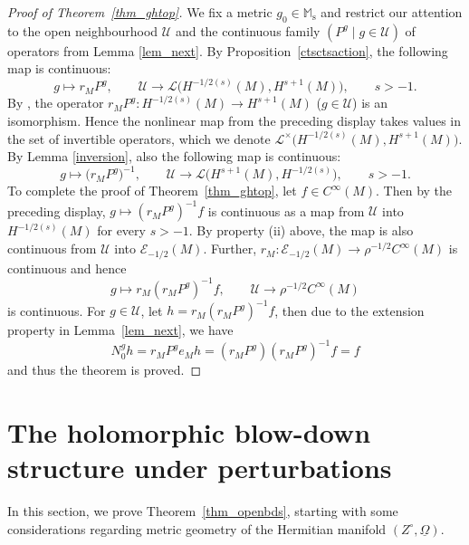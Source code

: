 \documentclass[10pt,a4paper]{amsart}
\numberwithin{equation}{section}
\theoremstyle{definition}
\newcommand{\M}{\mathbb{M}}
\newcommand{\1}{{\bf 1}}
\newcommand{\Om}{{\underline{\Omega}}}
\begin{document}
\begin{proof}[Proof of Theorem~\ref{thm_ghtop}] We fix a metric $g_0 \in \M_\mathrm{s}$ and restrict our attention to the open neighbourhood $\mathcal U$ and the continuous family $(P^g\mid g\in \mathcal U)$ of operators from Lemma \ref{lem_next}. By Proposition~\ref{ctsctsaction}, the following map is continuous:
\begin{equation*}
g\mapsto r_MP^g,\qquad \mathcal U\rightarrow \mathcal L\bigl(H^{-1/2(s)}(M),H^{s+1}(M)\bigr),\qquad s>-1.
\end{equation*}
By \cite[Theorem~4.4]{MNP19a}, the operator $r_MP^g \colon H^{-1/2(s)}(M)\rightarrow H^{s+1}(M)$ ($g\in \mathcal U$) is an isomorphism. Hence the nonlinear map from the preceding display takes values in the set of invertible operators, which we denote
$
\mathcal L^\times\bigl(H^{-1/2(s)}(M),H^{s+1}(M)\bigr)$.
By Lemma \ref{inversion}, also the following map is continuous:
\begin{equation*}
g\mapsto \bigl(r_M P^g\bigr)^{-1},\qquad \mathcal U \rightarrow \mathcal L\bigl(H^{s+1}(M),H^{-1/2(s)}\bigr),\qquad s>-1.
\end{equation*}
To complete the proof of Theorem~\ref{thm_ghtop}, let $f\in C^\infty(M)$. Then by the preceding display, $ g\mapsto (r_M P^g)^{-1} f$ is continuous as a map from $\mathcal U$ into $H^{-1/2(s)}(M)$ for every $s>-1$. By property (ii) above, the map is also continuous from $\mathcal U$ into $\mathcal E_{-1/2}(M)$. Further, $r_M\colon \mathcal E_{-1/2}(M)\rightarrow \rho^{-1/2}C^\infty(M)$ is continuous and hence
\begin{equation*}
g\mapsto r_M(r_MP^g)^{-1} f,\qquad \mathcal U\rightarrow \rho^{-1/2}C^\infty(M)
\end{equation*}
is continuous. For $g\in \mathcal U$, let $h=r_M(r_MP^g)^{-1} f$, then due to the extension property in Lemma~\ref{lem_next}, we have
\begin{equation*}
N_0^g h = r_M P^g e_M h = (r_MP^g)(r_MP^g)^{-1} f = f
\end{equation*}
and thus the theorem is proved.
\end{proof}

\section{The holomorphic blow-down structure under perturbations}\label{s_bds}

In this section, we prove Theorem~\ref{thm_openbds}, starting with some considerations regarding metric geometry of the Hermitian manifold $(Z^\circ,\Om)$.
\end{document}
